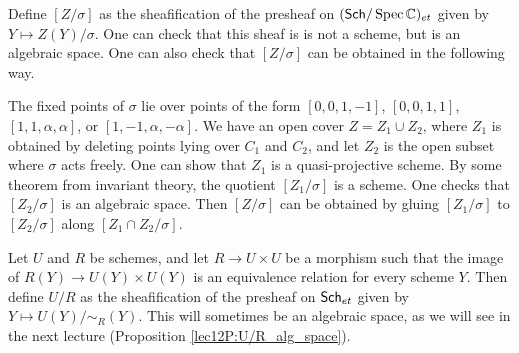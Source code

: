 %

 Define $[Z/\sigma]$ as the sheafification of the presheaf on $(\text{\sf Sch}/\operatorname{Spec} \mathbb{C})_{et}$ given
 by $Y\mapsto Z(Y)/\sigma$. One can check that this sheaf is is not a scheme, but is an
 algebraic space. One can also check that $[Z/\sigma]$ can be obtained in the following
 way. 

 The fixed points of $\sigma$ lie over points of the form $[0,0,1,-1]$, $[0,0,1,1]$,
 $[1,1,\alpha,\alpha]$, or $[1,-1,\alpha,-\alpha]$. We have an open cover $Z=Z_1\cup
 Z_2$, where $Z_1$ is obtained by deleting points lying over $C_1$ and $C_2$, and let
 $Z_2$ is the open subset where $\sigma$ acts freely. One can show that $Z_1$ is a
 quasi-projective scheme. By some theorem from invariant theory, the quotient
 $[Z_1/\sigma]$ is a scheme. One checks that $[Z_2/\sigma]$ is an algebraic space. Then
 $[Z/\sigma]$ can be obtained by gluing $[Z_1/\sigma]$ to $[Z_2/\sigma]$ along $[Z_1\cap
 Z_2/\sigma]$. 


 Let $U$ and $R$ be schemes, and let $R\to U\times U$ be a morphism such that
 the image of $R(Y)\to U(Y)\times U(Y)$ is an equivalence relation for every scheme $Y$.
 Then define $U/R$ as the sheafification of the presheaf on $\text{\sf Sch}_{et}$ given by
 $Y\mapsto U(Y)/\sim_R(Y)$. This will sometimes be an algebraic space, as we will see in
 the next lecture (Proposition \ref{lec12P:U/R_alg_space}).

